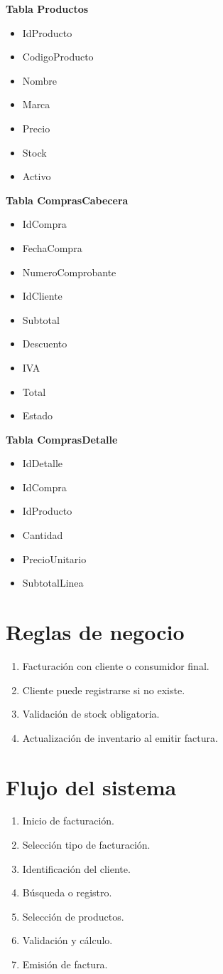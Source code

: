 \documentclass[12pt]{article}
\begin{document}
\textbf{Tabla Productos}
\begin{itemize}
\item IdProducto
\item CodigoProducto
\item Nombre
\item Marca
\item Precio
\item Stock
\item Activo
\end{itemize}

\textbf{Tabla ComprasCabecera}
\begin{itemize}
\item IdCompra
\item FechaCompra
\item NumeroComprobante
\item IdCliente
\item Subtotal
\item Descuento
\item IVA
\item Total
\item Estado
\end{itemize}

\textbf{Tabla ComprasDetalle}
\begin{itemize}
\item IdDetalle
\item IdCompra
\item IdProducto
\item Cantidad
\item PrecioUnitario
\item SubtotalLinea
\end{itemize}

\section{Reglas de negocio}
\begin{enumerate}
\item Facturación con cliente o consumidor final.
\item Cliente puede registrarse si no existe.
\item Validación de stock obligatoria.
\item Actualización de inventario al emitir factura.
\end{enumerate}

\section{Flujo del sistema}
\begin{enumerate}
\item Inicio de facturación.
\item Selección tipo de facturación.
\item Identificación del cliente.
\item Búsqueda o registro.
\item Selección de productos.
\item Validación y cálculo.
\item Emisión de factura.
\end{enumerate}
\end{document}
